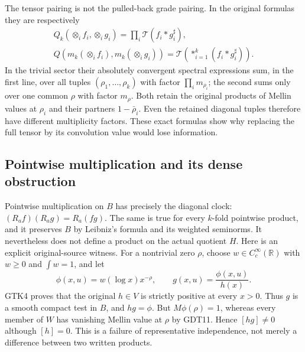 The tensor pairing is not the pulled-back grade
pairing. In the original formulas they are respectively
\begin{equation}\tag{GDT23}
 \begin{gathered}
 Q_k(\otimes_i f_i,\otimes_i g_i)
                  =\prod_i\mathscr T(f_i*g_i^\sharp),\\
 Q(m_k(\otimes_i f_i),m_k(\otimes_i g_i))
                  =\mathscr T\!\left(*_{i=1}^k
                                     (f_i*g_i^\sharp)\right).
 \end{gathered}
\end{equation}
In the trivial sector their absolutely convergent
spectral expressions sum, in the first line, over
all tuples $(\rho_1,\ldots,\rho_k)$ with factor
$\prod_i m_{\rho_i}$; the second sums only over
one common $\rho$ with factor $m_\rho$.
Both retain the original products of Mellin
values at $\rho_i$ and their partners
$1-\bar\rho_i$.
Even the retained diagonal tuples therefore have
different multiplicity factors. These exact
formulas show why replacing the full tensor by
its convolution value would lose information.

\subsection{Pointwise multiplication and its dense obstruction}

Pointwise multiplication on $B$ has precisely the
diagonal clock:
$(R_af)(R_ag)=R_a(fg)$.
The same is true for every $k$-fold pointwise
product, and it preserves $B$ by Leibniz's
formula and its weighted seminorms.
It nevertheless does not define a product on
the actual quotient $H$.
Here is an explicit original-source witness.
For a nontrivial zero $\rho$, choose
$w\in C_c^\infty(\mathbb R)$ with
$w\ge0$ and $\int w=1$, and let
\begin{equation}\tag{GDT24}
 \phi(x,u)=w(\log x)x^{-\rho},\qquad
 g(x,u)=\frac{\phi(x,u)}{h(x)}.
\end{equation}
GTK4 proves that the original $h\in V$ is strictly
positive at every $x>0$. Thus $g$ is a smooth
compact test in $B$, and $hg=\phi$.
But $M\phi(\rho)=1$, whereas every member of $W$
has vanishing Mellin value at $\rho$ by GDT11.
Hence $[hg]\ne0$ although $[h]=0$.
This is a failure of representative independence,
not merely a difference between two written products.


